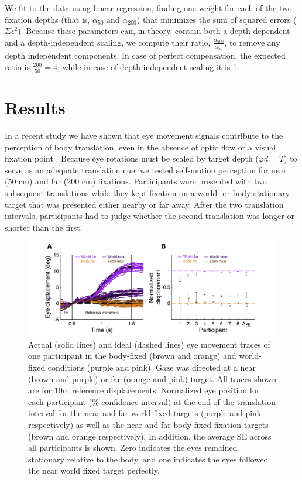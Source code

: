 We fit  to the data using linear regression, finding one weight for each of the two fixation depths (that is, $\alpha_{50}$ and $\alpha_{200}$) that minimizes the sum of squared errors ($\Sigma \epsilon^2$). Because these parameters can, in theory, contain both a depth-dependent and a depth-independent scaling, we compute their ratio, $\frac{\alpha_{200}}{\alpha_{50}}$, to remove any depth independent components. In case of perfect compensation, the expected ratio is $\frac{200}{50} = 4$, while in case of depth-independent scaling it is 1.




\section{Results}

In a recent study we have shown that eye movement signals contribute to the perception of body translation, even in the absence of optic flow or a visual fixation point \cite{clemens2015a}. Because eye rotations must be scaled by target depth ($\varphi d = T$) to serve as an adequate translation cue, we tested self-motion perception for near (50 \si{\centi\metre}) and far (200 \si{\centi\metre}) fixations. Participants were presented with two subsequent translations  while they kept fixation on a world- or body-stationary target that was presented either nearby or far away. After the two translation intervals, participants had to judge whether the second translation was longer or shorter than the first.

\begin{figure}
    \includegraphics[width=1.0\textwidth]{src/paper4/p4_figure2.pdf}

    \caption{ Actual (solid lines) and ideal (dashed lines) eye movement traces of one participant in the body-fixed (brown and orange) and world-fixed conditions (purple and pink). Gaze was directed at a near (brown and purple) or far (orange and pink) target. All traces shown are for 10m reference displacements.  Normalized eye position for each participant (\% confidence interval) at the end of the translation interval for the near and far world fixed targets (purple and pink respectively) as well as the near and far body fixed fixation targets (brown and orange respectively). In addition, the average \textpm SE across all participants is shown. Zero indicates the eyes remained stationary relative to the body, and one indicates the eyes followed the near world fixed target perfectly.}
    \label{p4:fig2}
\end{figure}


